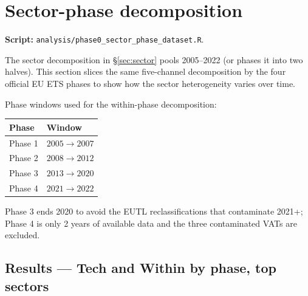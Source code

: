 \documentclass[11pt]{article}
\begin{document}
\section{Sector-phase decomposition}
\label{sec:sectorphase}

\textbf{Script:} \texttt{analysis/phase0\_sector\_phase\_dataset.R}.

The sector decomposition in \S\ref{sec:sector} pools 2005--2022 (or phases it into two halves). This section slices the same five-channel decomposition by the four official EU ETS phases to show how the sector heterogeneity varies over time.

Phase windows used for the within-phase decomposition:
\begin{center}
\begin{tabular}{ll}
\toprule
Phase & Window \\
\midrule
Phase 1 & $2005 \to 2007$ \\
Phase 2 & $2008 \to 2012$ \\
Phase 3 & $2013 \to 2020$ \\
Phase 4 & $2021 \to 2022$ \\
\bottomrule
\end{tabular}
\end{center}
Phase 3 ends 2020 to avoid the EUTL reclassifications that contaminate 2021+; Phase 4 is only 2 years of available data and the three contaminated VATs are excluded.

\subsection{Results --- Tech and Within by phase, top sectors}
\end{document}
